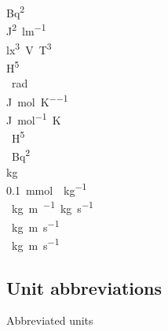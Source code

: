 \documentclass{article}
\begin{document}
\unit{\square\becquerel} \\
\unit{\joule\squared\per\lumen} \\
\unit{\cubic\lux\volt\tesla\cubed} \\
\unit{\henry\tothe{5}} \\
\unit{\radian} \\
\unit{\joule\per\mole\per\kelvin} \\
\unit{\joule\per\mole\kelvin} \\
\unit{\per\henry\tothe{5}} \\
\unit{\per\square\becquerel} \\
\unit{\kilogram{}} \\
\qty[qualifier-mode = bracket]{0.1}{\milli\mole{}\per\kilogram{}} \\
\unit[per-mode = fraction]{\cancel\kilogram\metre\per\cancel\kilogram\per\second} \\
\unit{\kilogram\metre\per\second} \\
\unit[unit-color = purple]{\kilogram\metre\per\second} %

\subsection{Unit abbreviations}

Abbreviated units
\end{document}
